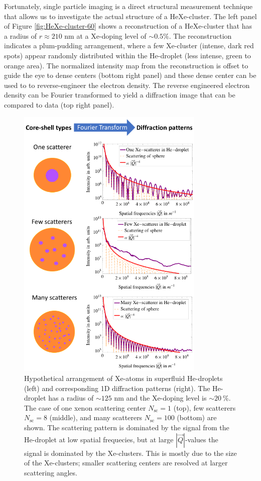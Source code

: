 Fortunately, single particle imaging is a direct structural measurement technique that allows us to investigate the actual structure of a HeXe-cluster. The left panel of Figure \ref{fig:HeXe-cluster-60} shows a reconstruction of a HeXe-cluster that has a radius of $r\approx 210$ nm at a Xe-doping level of $\sim 0.5 \%$. The reconstruction indicates a plum-pudding arrangement, where a few Xe-cluster (intense, dark red spots) appear randomly distributed within the He-droplet (less intense, green to orange area). The normalized intensity map from the reconstruction is offset to guide the eye to dense centers (bottom right panel) and these dense center can be used to to reverse-engineer the electron density. The reverse engineered electron density can be Fourier transformed to yield a diffraction image that can be compared to data (top right panel).
%
\begin{figure}
 	\centering
 		\includegraphics[width=0.80\textwidth]{images/results/plum-pudding.png}
 	\caption[Hypothetical arrangement of Xe-clusters within He-droplets.]{Hypothetical arrangement of Xe-atoms in superfluid He-droplets (left) and corresponding 1D diffraction patterns (right). The He-droplet has a radius of $\sim 125$ nm and the Xe-doping level is $\sim \SI{20}{\percent}$. The case of one xenon scattering center $N_{\text{sc}}=1$ (top), few scatterers $N_{\text{sc}}=8$ (middle), and many scatterers $N_{\text{sc}}=100$ (bottom) are shown. The scattering pattern is dominated by the signal from the He-droplet at low spatial frequecies, but at large $\left|\vec{Q}\right|$-values the signal is dominated by the Xe-clusters. This is mostly due to the size of the Xe-clusters; smaller scattering centers are resolved at larger scattering angles.}
 	\label{fig:HeXe-plum-pudding}
\end{figure}
